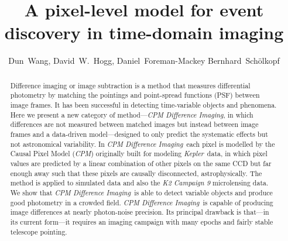 \documentclass[12pt, preprint]{aastex}
\newcommand{\project}[1]{\textsl{#1}}
\newcommand{\cpm}{\project{CPM}}
\newcommand{\cpmdiff}{\project{CPM Difference Imaging}}
\newcommand{\kepler}{\project{Kepler}}
\begin{document}
\title{A pixel-level model for event discovery in time-domain imaging}
\author{%
  Dun~Wang\altaffilmark{\ref{CCPP},\ref{email}},
  David~W.~Hogg\altaffilmark{\ref{CCPP},\ref{CDS},\ref{MPIA},\ref{FI}},
  Daniel~Foreman-Mackey\altaffilmark{\ref{UW},\ref{SF}}
  Bernhard~Sch\"olkopf\altaffilmark{\ref{MPIIS}}
  }
\setcounter{address}{1}




\begin{abstract}
Difference imaging or image subtraction is a method that measures differential photometry by matching the pointings and point-spread functions (PSF) between image frames. 
It has been successful in detecting time-variable objects and phenomena.
Here we present a new category of method---\cpmdiff, in which differences are not measured between matched images but instead between image frames and a data-driven model---designed to only predict the systematic effects but not astronomical variability. 
In \cpmdiff\ each pixel is modelled by the Causal Pixel Model (\cpm) originally built for modeling \kepler\ data, in which pixel values are predicted by a linear combination of other pixels on the same CCD but far enough away such that these pixels are causally disconnected, astrophysically. 
The method is applied to  simulated data and also the \project{K2 Campaign 9} microlensing data. We show that \cpmdiff\ is able to detect variable objects and produce good photometry in a crowded field.
\cpmdiff\ is capable of producing image differences at nearly photon-noise precision. 
Its principal drawback is that---in its current form---it requires an imaging campaign with many epochs and fairly stable telescope pointing.
\end{abstract}
\end{document}
